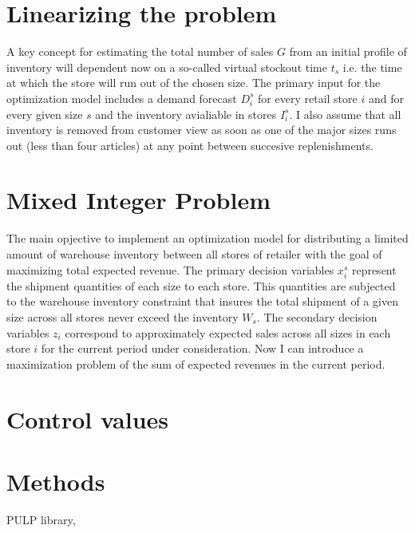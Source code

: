\documentclass[11pt,fleqn]{book} %
\begin{document}
\begin{itemize}
\section{Linearizing the problem}
A key concept for estimating the total number of sales $G$ from an initial profile of inventory will dependent now on a so-called virtual stockout time $t_s$ i.e. the time at which the store will run out of the chosen size. The primary input for the optimization model includes a demand forecast $D_i^s$ for every retail store $i$ and for every given size $s$ and the inventory avialiable in stores $I_i^s$. I also assume that all inventory is removed from customer view as soon as one of the major sizes runs out (less than four articles) at any point between succesive replenishments.

\section{Mixed Integer Problem}
The main opjective to implement an optimization model for distributing a limited amount of warehouse inventory between all stores of retailer with the goal of maximizing total expected revenue. The primary decision variables $x_i^s$ represent the shipment quantities of each size to each store. This quantities are subjected to the warehouse inventory constraint that insures the total shipment of a given size across all stores never exceed the inventory $W_s$. The secondary decision variables $z_i$ correspond to approximately expected sales across all sizes in each store $i$ for the current period under consideration. Now I can introduce a maximization problem of the sum of expected revenues in the current period.

\section{Control values}



\section{Methods}

 PULP library, 


\end{itemize}
\end{document}
